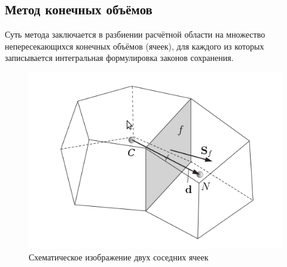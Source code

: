 	\newpage
	\subsection{Метод конечных объёмов}
		Суть метода заключается в разбиении расчётной области на множество непересекающихся конечных объёмов (ячеек), для каждого из которых записывается интегральная формулировка законов сохранения.
		\begin{figure}
			\centering
			\includegraphics[scale=0.5]{twoCells}
			\caption{Схематическое изображение двух соседних ячеек}
			\label{fig:twoCells}
		\end{figure}
